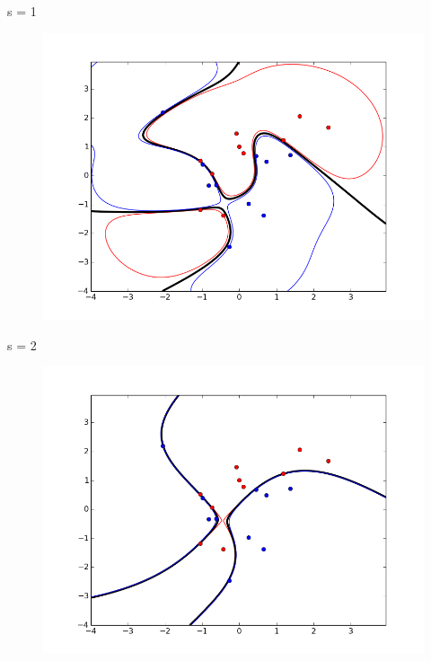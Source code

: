 \documentclass{article}
\begin{document}
s = 1 
\begin{figure}[H]
    \centering
    \includegraphics[width=1.0\linewidth]{../img/radial_s1_hard_s1.png}
\end{figure}

s = 2 
\begin{figure}[H]
    \centering
    \includegraphics[width=1.0\linewidth]{../img/radial_s1_hard_s2.png}
\end{figure}
\end{document}
